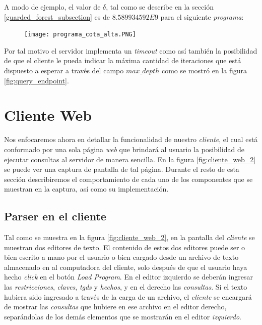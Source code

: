 \documentclass[11pt,a4paper,twoside]{tesis}
\begin{document}
A modo de ejemplo, el valor de $\delta$, tal como se describe en la sección \ref{guarded_forest_subsection} es de $8.589934592E9$ para el siguiente \textit{programa}:

\begin{figure}[ht]
    \texttt{[image: programa\_cota\_alta.PNG]}
    \centering
    \label{fig:programa_cota_alta}
\end{figure}

Por tal motivo el servidor implementa un \textit{timeout} como así también la posibilidad de que el cliente le pueda indicar la máxima cantidad de iteraciones que está dispuesto a esperar a través del campo \textit{$max\_depth$} como se mostró en la figura \ref{fig:query_endpoint}.  

\section{Cliente Web}

Nos enfocaremos ahora en detallar la funcionalidad de nuestro \textit{cliente}, el cual está conformado por una sola página \textit{web} que brindará al usuario la posibilidad de ejecutar consultas al servidor de manera sencilla. En la figura \ref{fig:cliente_web_2} se puede ver una captura de pantalla de tal página. Durante el resto de esta sección describiremos el comportamiento de cada uno de los componentes que se muestran en la captura, así como su implementación.

\subsection{Parser en el cliente}

Tal como se muestra en la figura \ref{fig:cliente_web_2}, en la pantalla del \textit{cliente} se muestran dos editores de texto. El contenido de estos dos editores puede ser o bien escrito a mano por el usuario o bien cargado desde un archivo de texto almacenado en al computadora del cliente, solo después de que el usuario haya hecho \textit{click} en el botón \textit{Load Program}. En el editor izquierdo se deberán ingresar las \textit{restricciones}, \textit{claves}, \textit{tgds} y \textit{hechos}, y en el derecho las \textit{consultas}. Si el texto hubiera sido ingresado a través de la carga de un archivo, el \textit{cliente} se encargará de mostrar las \textit{consultas} que hubiere en ese archivo en el editor derecho, separándolas de los demás elementos que se mostrarán en el editor \textit{izquierdo}. 
\end{document}
